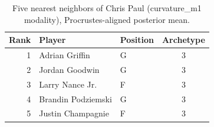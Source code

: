 \begin{table}[htbp]
  \centering\small
  \begin{tabular}{rllc}
    \toprule
    Rank & Player & Position & Archetype \\
    \midrule
    1 & Adrian Griffin & G & 3 \\
    2 & Jordan Goodwin & G & 3 \\
    3 & Larry Nance Jr. & F & 3 \\
    4 & Brandin Podziemski & G & 3 \\
    5 & Justin Champagnie & F & 3 \\
    \bottomrule
  \end{tabular}
  \caption{Five nearest neighbors of Chris Paul (curvature_m1 modality), Procrustes-aligned posterior mean.}
  \label{tab:Chris_Paul_neighbors_curvature_m1}
\end{table}

